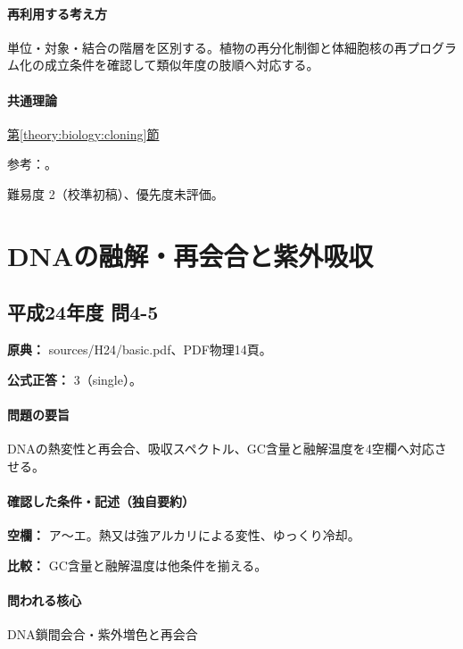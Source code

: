 \paragraph{再利用する考え方} 単位・対象・結合の階層を区別する。植物の再分化制御と体細胞核の再プログラム化の成立条件を確認して類似年度の肢順へ対応する。

\paragraph{共通理論} \hyperref[theory:biology:cloning]{第\ref*{theory:biology:cloning}節}

\par 参考：\cite{plant_regeneration,nhgri_cloning}。

\par 難易度 2（校準初稿）、優先度未評価。

\section{DNAの融解・再会合と紫外吸収}

\subsection{平成24年度 問4-5}
\label{q:h24-reg-basic-4-5}

\noindent\textbf{原典：} sources/H24/basic.pdf、PDF物理14頁。

\textbf{公式正答：} 3（single）。

\paragraph{問題の要旨} DNAの熱変性と再会合、吸収スペクトル、GC含量と融解温度を4空欄へ対応させる。

\paragraph{確認した条件・記述（独自要約）}\mbox{}\par

\noindent\textbf{空欄：} ア〜エ。熱又は強アルカリによる変性、ゆっくり冷却。\par

\noindent\textbf{比較：} GC含量と融解温度は他条件を揃える。\par

\paragraph{問われる核心} DNA鎖間会合・紫外増色と再会合

